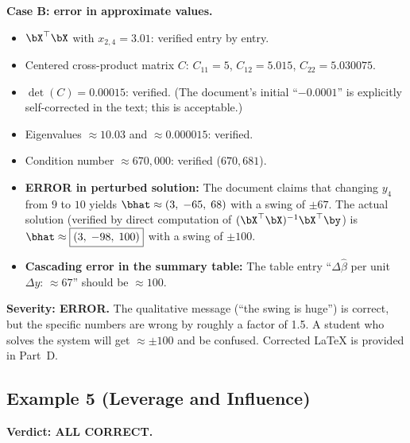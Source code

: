 \medskip
\noindent\textbf{Case B: error in approximate values.}
\begin{itemize}[nosep]
  \item $\bX^\top\bX$ with $x_{2,4}=3.01$: verified entry by entry. \checkmark
  \item Centered cross-product matrix $C$: $C_{11}=5$, $C_{12}=5.015$, $C_{22}=5.030075$. \checkmark
  \item $\det(C) = 0.00015$: verified. \checkmark
        (The document's initial ``$-0.0001$'' is explicitly self-corrected in the text; this is acceptable.)
  \item Eigenvalues $\approx 10.03$ and $\approx 0.000015$: verified. \checkmark
  \item Condition number $\approx 670{,}000$: verified ($670{,}681$). \checkmark
  \item[\bfseries !] \textbf{ERROR in perturbed solution:}
        The document claims that changing $y_4$ from $9$ to $10$ yields
        $\bhat \approx (3,\;-65,\;68)$ with a swing of $\pm 67$.
        The actual solution (verified by direct computation of
        $(\bX^\top\bX)^{-1}\bX^\top\by$) is
        $\bhat \approx \boxed{(3,\;-98,\;100)}$
        with a swing of $\pm 100$.
  \item[\bfseries !] \textbf{Cascading error in the summary table:}
        The table entry ``$\Delta\hat\beta$ per unit $\Delta y$: $\approx 67$''
        should be $\boxed{\approx 100}$.
\end{itemize}

\medskip
\noindent\textbf{Severity: ERROR.}
The qualitative message (``the swing is huge'') is correct, but the
specific numbers are wrong by roughly a factor of 1.5.  A student who
solves the system will get $\approx\pm 100$ and be confused.
Corrected LaTeX is provided in Part~D.



\subsection*{Example 5 (Leverage and Influence)}

\textbf{Verdict: ALL CORRECT.}

